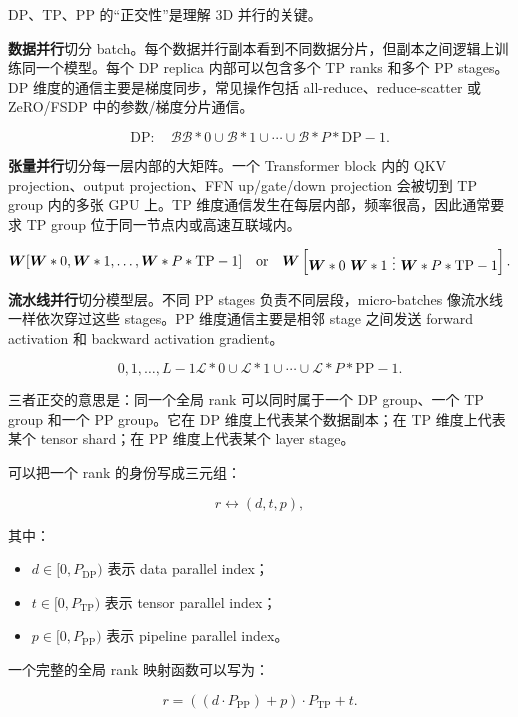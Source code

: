 DP、TP、PP 的“正交性”是理解 3D 并行的关键。

\textbf{数据并行}切分 batch。每个数据并行副本看到不同数据分片，但副本之间逻辑上训练同一个模型。每个 DP replica 内部可以包含多个 TP ranks 和多个 PP stages。DP 维度的通信主要是梯度同步，常见操作包括 all-reduce、reduce-scatter 或 ZeRO/FSDP 中的参数/梯度分片通信。

\[
\text{DP}: \quad
\mathcal{B}
\mathcal{B}*0
\cup
\mathcal{B}*1
\cup
\cdots
\cup
\mathcal{B}*{P*{\mathrm{DP}}-1}.
\]

\textbf{张量并行}切分每一层内部的大矩阵。一个 Transformer block 内的 QKV projection、output projection、FFN up/gate/down projection 会被切到 TP group 内的多张 GPU 上。TP 维度通信发生在每层内部，频率很高，因此通常要求 TP group 位于同一节点内或高速互联域内。

\[
\bm{W}
[\bm{W}*0,\bm{W}*1,\ldots,\bm{W}*{P*{\mathrm{TP}}-1}]
\quad
\text{or}
\quad
\bm{W}
\begin{bmatrix}
\bm{W}*0\
\bm{W}*1\
\vdots\
\bm{W}*{P*{\mathrm{TP}}-1}
\end{bmatrix}.
\]

\textbf{流水线并行}切分模型层。不同 PP stages 负责不同层段，micro-batches 像流水线一样依次穿过这些 stages。PP 维度通信主要是相邻 stage 之间发送 forward activation 和 backward activation gradient。

\[
{0,1,\ldots,L-1}
\mathcal{L}*0
\cup
\mathcal{L}*1
\cup
\cdots
\cup
\mathcal{L}*{P*{\mathrm{PP}}-1}.
\]

三者正交的意思是：同一个全局 rank 可以同时属于一个 DP group、一个 TP group 和一个 PP group。它在 DP 维度上代表某个数据副本；在 TP 维度上代表某个 tensor shard；在 PP 维度上代表某个 layer stage。

可以把一个 rank 的身份写成三元组：

\[
r
\leftrightarrow
(d,t,p),
\]

其中：

\begin{itemize}
\item $d\in[0,P_{\mathrm{DP}})$ 表示 data parallel index；
\item $t\in[0,P_{\mathrm{TP}})$ 表示 tensor parallel index；
\item $p\in[0,P_{\mathrm{PP}})$ 表示 pipeline parallel index。
\end{itemize}

一个完整的全局 rank 映射函数可以写为：

\[
r
=
((d\cdot P_{\mathrm{PP}})+p)\cdot P_{\mathrm{TP}}+t.
\]

